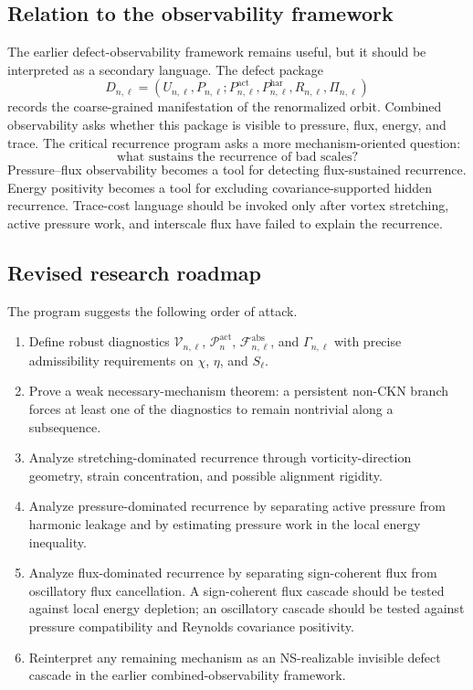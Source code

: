 \documentclass[11pt]{article}
\numberwithin{equation}{section}
\theoremstyle{plain}
\theoremstyle{definition}
\theoremstyle{remark}
\newcommand{\har}{\mathrm{har}}
\newcommand{\Vort}{\mathcal V}
\newcommand{\Flux}{\mathcal F}
\newcommand{\Press}{\mathcal P}
\newcommand{\act}{\mathrm{act}}
\newcommand{\absop}{\mathrm{abs}}
\begin{document}
\subsection{Relation to the observability framework}

The earlier defect-observability framework remains useful, but it should be interpreted as a secondary language.  The defect package
\[
    D_{n,\ell}
    =
    (U_{n,\ell},P_{n,\ell};P^{\act}_{n,\ell},P^{\har}_{n,\ell},R_{n,\ell},\Pi_{n,\ell})
\]
records the coarse-grained manifestation of the renormalized orbit.  Combined observability asks whether this package is visible to pressure, flux, energy, and trace.  The critical recurrence program asks a more mechanism-oriented question:
\[
    \boxed{
    \text{what sustains the recurrence of bad scales?}
    }
\]
Pressure--flux observability becomes a tool for detecting flux-sustained recurrence.  Energy positivity becomes a tool for excluding covariance-supported hidden recurrence.  Trace-cost language should be invoked only after vortex stretching, active pressure work, and interscale flux have failed to explain the recurrence.

\subsection{Revised research roadmap}

The program suggests the following order of attack.

\begin{enumerate}[label=\textup{Step \arabic*:}, leftmargin=3em]
\item Define robust diagnostics \(\Vort_{n,\ell}\), \(\Press^{\act}_n\), \(\Flux^{\absop}_{n,\ell}\), and \(\Gamma_{n,\ell}\) with precise admissibility requirements on \(\chi\), \(\eta\), and \(S_\ell\).

\item Prove a weak necessary-mechanism theorem: a persistent non-CKN branch forces at least one of the diagnostics to remain nontrivial along a subsequence.

\item Analyze stretching-dominated recurrence through vorticity-direction geometry, strain concentration, and possible alignment rigidity.

\item Analyze pressure-dominated recurrence by separating active pressure from harmonic leakage and by estimating pressure work in the local energy inequality.

\item Analyze flux-dominated recurrence by separating sign-coherent flux from oscillatory flux cancellation.  A sign-coherent flux cascade should be tested against local energy depletion; an oscillatory cascade should be tested against pressure compatibility and Reynolds covariance positivity.

\item Reinterpret any remaining mechanism as an NS-realizable invisible defect cascade in the earlier combined-observability framework.
\end{enumerate}
\end{document}

